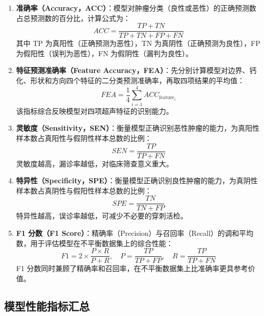 \documentclass[UTF8]{ctexart}
\begin{document}
\begin{enumerate}[label=\textbf{（\arabic*）}, leftmargin=2em]
    \item \textbf{准确率（Accuracy，ACC）}：模型对肿瘤分类（良性或恶性）的正确预测数占总预测数的百分比，计算公式为：
    \begin{equation}
        ACC = \frac{TP + TN}{TP + TN + FP + FN}
    \end{equation}
    其中 TP 为真阳性（正确预测为恶性），TN 为真阴性（正确预测为良性），FP 为假阳性（误判为恶性），FN 为假阴性（漏判为良性）。

    \item \textbf{特征预测准确率（Feature Accuracy，FEA）}：先分别计算模型对边界、钙化、形状和方向四个特征的二分类预测准确率，再取四项结果的平均值：
    \begin{equation}
        FEA = \frac{1}{4}\sum_{i=1}^{4} ACC_{\text{feature}_i}
    \end{equation}
    该指标综合反映模型对四项超声特征的识别能力。

    \item \textbf{灵敏度（Sensitivity，SEN）}：衡量模型正确识别恶性肿瘤的能力，为真阳性样本数占真阳性与假阴性样本总数的比例：
    \begin{equation}
        SEN = \frac{TP}{TP + FN}
    \end{equation}
    灵敏度越高，漏诊率越低，对临床筛查意义重大。

    \item \textbf{特异性（Specificity，SPE）}：衡量模型正确识别良性肿瘤的能力，为真阴性样本数占真阴性与假阳性样本总数的比例：
    \begin{equation}
        SPE = \frac{TN}{TN + FP}
    \end{equation}
    特异性越高，误诊率越低，可减少不必要的穿刺活检。

    \item \textbf{F1 分数（F1 Score）}：精确率（Precision）与召回率（Recall）的调和平均数，用于评估模型在不平衡数据集上的综合性能：
    \begin{equation}
        F1 = 2 \times \frac{P \times R}{P + R},\quad P = \frac{TP}{TP + FP},\quad R = \frac{TP}{TP + FN}
    \end{equation}
    F1 分数同时兼顾了精确率和召回率，在不平衡数据集上比准确率更具参考价值。
\end{enumerate}

\subsection{模型性能指标汇总}
\end{document}
